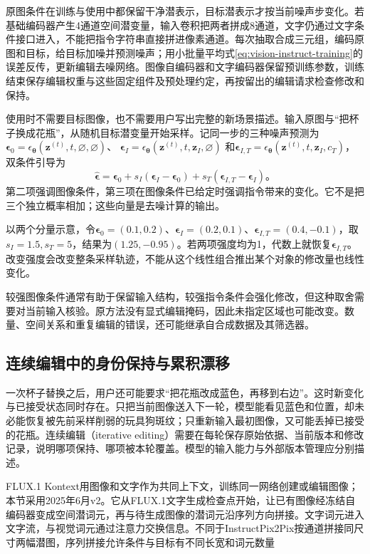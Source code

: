 原图条件在训练与使用中都保留干净潜表示，目标潜表示才按当前噪声步变化。若基础编码器产生4通道空间潜变量，输入卷积把两者拼成8通道，文字仍通过文字条件接口进入，不能把指令字符串直接拼进像素通道。每次抽取合成三元组，编码原图和目标，给目标加噪并预测噪声；用小批量平均式\eqref{eq:vision-instruct-training}的误差反传，更新编辑去噪网络。图像自编码器和文字编码器保留预训练参数，训练结束保存编辑权重与这些固定组件及预处理约定，再按留出的编辑请求检查修改和保持。

使用时不需要目标图像，也不需要用户写出完整的新场景描述。输入原图与“把杯子换成花瓶”，从随机目标潜变量开始采样。记同一步的三种噪声预测为
$\bm{\epsilon}_0=\epsilon_{\bm{\theta}}(\bm{z}^{(t)},t,\varnothing,\varnothing)$、
$\bm{\epsilon}_I=\epsilon_{\bm{\theta}}(\bm{z}^{(t)},t,\bm{z}_I,\varnothing)$
和$\bm{\epsilon}_{I,T}=\epsilon_{\bm{\theta}}(\bm{z}^{(t)},t,\bm{z}_I,c_T)$，双条件引导为
\begin{equation}
 \hat{\bm{\epsilon}}
 =\bm{\epsilon}_0
  +s_I(\bm{\epsilon}_I-\bm{\epsilon}_0)
  +s_T(\bm{\epsilon}_{I,T}-\bm{\epsilon}_I)\text{。}
 \label{eq:vision-instruct-guidance}
\end{equation}
第二项强调图像条件，第三项在图像条件已给定时强调指令带来的变化。它不是把三个独立概率相加；这些向量是去噪计算的输出。

以两个分量示意，令$\bm{\epsilon}_0=(0.1,0.2)$、$\bm{\epsilon}_I=(0.2,0.1)$、$\bm{\epsilon}_{I,T}=(0.4,-0.1)$，取$s_I=1.5,s_T=5$，结果为$(1.25,-0.95)$。若两项强度均为1，代数上就恢复$\bm{\epsilon}_{I,T}$。改变强度会改变整条采样轨迹，不能从这个线性组合推出某个对象的修改量也线性变化。

较强图像条件通常有助于保留输入结构，较强指令条件会强化修改，但这种取舍需要对当前输入核验。原方法没有显式编辑掩码，因此未指定区域也可能改变。数量、空间关系和重复编辑的错误，还可能继承自合成数据及其筛选器。

\subsection{连续编辑中的身份保持与累积漂移}
\label{sec:vision-generation-kontext-history}

一次杯子替换之后，用户还可能要求“把花瓶改成蓝色，再移到右边”。这时新变化与已接受状态同时存在。只把当前图像送入下一轮，模型能看见蓝色和位置，却未必能恢复被先前采样削弱的玩具狗斑纹；只重新输入最初图像，又可能丢掉已接受的花瓶。连续编辑（iterative editing）需要在每轮保存原始依据、当前版本和修改记录，说明哪项保持、哪项被本轮覆盖。模型的输入能力与外部版本管理应分别描述。

FLUX.1 Kontext用图像和文字作为共同上下文，训练同一网络创建或编辑图像；本节采用2025年6月v2。它从FLUX.1文字生成检查点开始，让已有图像经冻结自编码器变成空间潜词元，再与待生成图像的潜词元沿序列方向拼接。文字词元进入文字流，与视觉词元通过注意力交换信息。不同于InstructPix2Pix按通道拼接同尺寸两幅潜图，序列拼接允许条件与目标有不同长宽和词元数量

